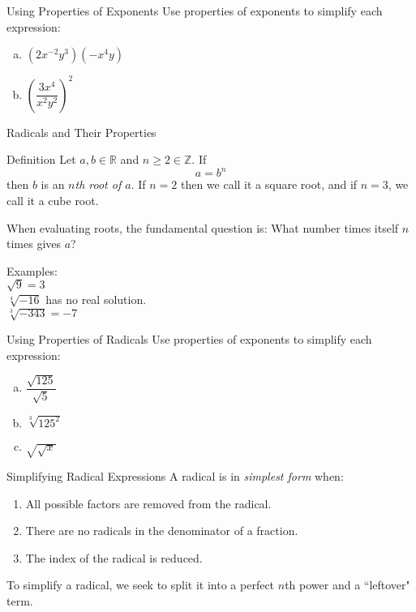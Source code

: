 \documentclass{beamer}
\def\R{\mathbb{R}} %
\def\Z{\mathbb{Z}} %
\newcommand{\fp}[1]{\left({#1}\right)} %
\begin{document}
\begin{frame}[t]{Using Properties of Exponents}
Use properties of exponents to simplify each expression: \begin{enumerate}[(a)]
\item $\fp{2x^{-2}y^3}\fp{-x^4y}$
\item $\fp{\dfrac{3x^4}{x^2y^2}}^2$
\end{enumerate}
\end{frame}

\begin{frame}[t]{Radicals and Their Properties}
\begin{block}{Definition}
Let $a,b\in\R$ and $n\geq 2 \in \Z$. If $$a = b^n$$ then $b$ is an \textit{$n$th root of $a$}. If $n = 2$ then we call it a square root, and if $n =3$, we call it a cube root.
\end{block}

When evaluating roots, the fundamental question is: What number times itself $n$ times gives $a$?

\pause
Examples: \\
$\sqrt{9} = 3$ \\ \pause
$\sqrt[4]{-16}$ has no real solution. \\ \pause
$\sqrt[3]{-343} = -7$

\end{frame}

\begin{frame}[t]{Using Properties of Radicals}
Use properties of exponents to simplify each expression:
\begin{enumerate}[(a)]
\item $\dfrac{\sqrt{125}}{\sqrt{5}}$
\item $\sqrt[3]{125^2}$
\item $\sqrt{\sqrt{x}}$
\end{enumerate}
\end{frame}

\begin{frame}[t]{Simplifying Radical Expressions}
A radical is in \textit{simplest form} when: \begin{enumerate}
\item All possible factors are removed from the radical.
\item There are no radicals in the denominator of a fraction.
\item The index of the radical is reduced.
\end{enumerate}

To simplify a radical, we seek to split it into a perfect $n$th power and a ``leftover" term.
\end{frame}
\end{document}
